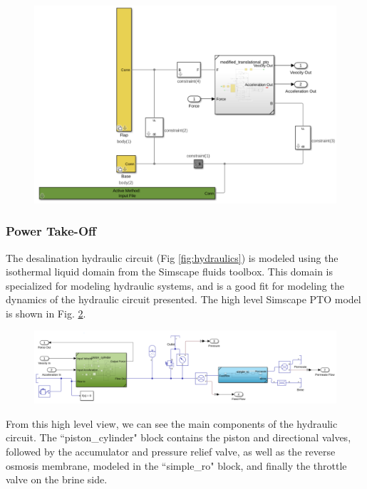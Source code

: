 \documentclass[twocolumn,10pt]{asme2e}
\begin{document}
\begin{figure}[b!]
    \includegraphics[width=\linewidth]{../figs/wecsimscape.pdf}
    \label{fig:wec_simscape}
\end{figure}

\subsubsection{Power Take-Off}

The desalination hydraulic circuit (Fig \ref{fig:hydraulics}) is modeled using the isothermal liquid domain from the Simscape fluids toolbox. This domain is specialized for modeling hydraulic systems, and is a good fit for modeling the dynamics of the hydraulic circuit presented. The high level Simscape PTO model is shown in Fig. \ref{fig:hydraulic_simscape}.

\begin{figure}[t]  %
    \centering
    \includegraphics[width=0.8\linewidth]{../figs/hydraulic_simscape.pdf}
    \label{fig:hydraulic_simscape}
\end{figure}

From this high level view, we can see the main components of the hydraulic circuit. The ``piston\_cylinder" block contains the piston and directional valves, followed by the accumulator and pressure relief valve, as well as the reverse osmosis membrane, modeled in the ``simple\_ro" block, and finally the throttle valve on the brine side.
\end{document}
